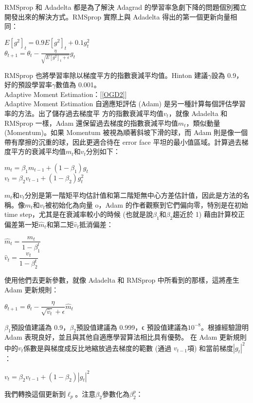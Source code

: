 \begin{itemize}
 RMSprop 和 Adadelta 都是為了解決 Adagrad 的學習率急劇下降的問題個別獨立開發出來的解決方式。RMSprop 實際上與 Adadelta 得出的第一個更新向量相同：
\begin{center}
$E[g^2]_t=0.9E[g^2]_t+0.1g^2 _t$
\\
$\theta_{t+1}=\theta_t-\frac{\eta}{\sqrt{E[g^2]_t+\epsilon}}g_t$
\end{center}

 RMSprop 也將學習率除以梯度平方的指數衰減平均值。Hinton 建議$\gamma$設為 0.9，好的預設學習率$\gamma$數值為 0.001。\\
Adaptive Moment Estimation：[\ref{OGD2}]\\
 Adaptive Moment Estimation 自適應矩評估 (Adam) 是另一種計算每個評估學習率的方法。出了儲存過去梯度平 方的指數衰減平均值$v_t$，就像 Adadelta 和 RMSprop 一樣，Adam 還保留過去梯度的指數衰減平均值$m_t$，類似動量 (Momentum)。如果 Momentum 被視為順著斜坡下滑的球，而 Adam 則是像一個帶有摩擦的沉重的球，因此更適合待在 error face 平坦的最小值區域。計算過去梯度平方的衰減平均值$m_t$和$v_t$分別如下：
\begin{center}
$m_t=\beta_1 m_{t-1}+(1-\beta_1)g_t$\\
$v_t=\beta_2 v_{t-1}+(1-\beta_2)g^2 _t$
\end{center}
$m_t$和$v_t$分別是第一階矩平均估計值和第二階矩無中心方差估計值，因此是方法的名稱。像$m_t$和$v_t$被初始化為向量 o，Adam 的作者觀察到它們偏向零，特別是在初始 time step，尤其是在衰減率較小的時候 (也就是說$\beta_1$和$\beta_2$趨近於 1) 藉由計算校正偏差第一矩$\hat{m}_t$和第二矩$\hat{v}_t$抵消偏差：
\begin{center}
$\hat{m}_t = \dfrac{m_t}{1 - \beta^t_1}$\\
$\hat{v}_t = \dfrac{v_t}{1 - \beta^t_2}$
\end{center}
使用他們去更新參數，就像 Adadelta 和 RMSprop 中所看到的那樣，這將產生 Adam 更新規則：
\begin{center}
$\theta_{t+1} = \theta_{t} - \dfrac{\eta}{\sqrt{\hat{v}_t} + \epsilon} \hat{m}_t$
\end{center}
$\beta_1$預設值建議為 0.9，$\beta_2$預設值建議為 0.999，ϵ 預設值建議為$10^{-8}$。根據經驗證明 Adam 表現良好，並且與其他自適應學習算法相比具有優勢。
在 Adam 更新規則中的$v_t$係數是與梯度成反比地縮放過去梯度的範數 (通過 $v_{t-1}$項) 和當前梯度$|g_t|^2$：
\begin{center}
$v_t = \beta_2 v_{t-1} + (1 - \beta_2) |g_t|^2$
\end{center}
我們轉換這個更新到$\ell_p$。注意$\beta_2$參數化為$\beta_2^p$：
\begin{center}

\end{center}
\end{itemize}
